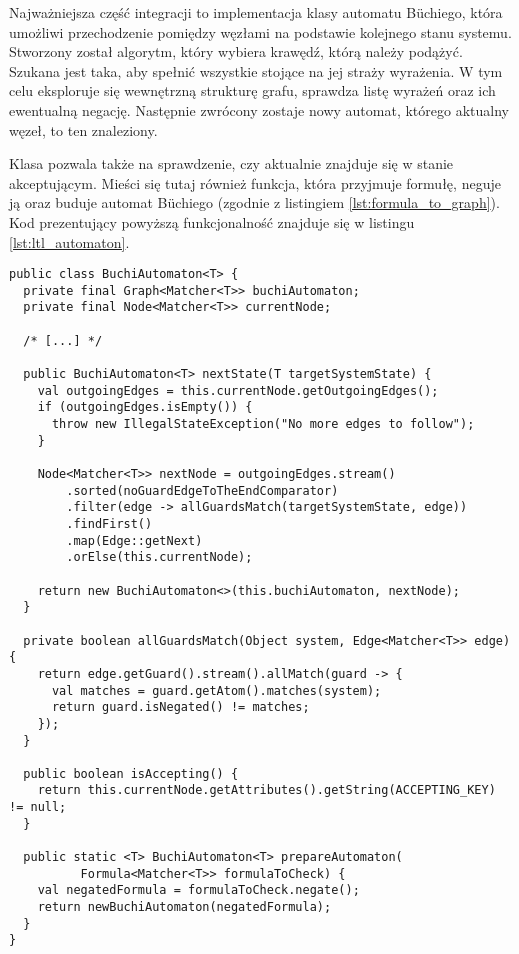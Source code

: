 Najważniejsza część integracji to implementacja klasy automatu Büchiego, która umożliwi przechodzenie pomiędzy węzłami na podstawie kolejnego stanu systemu.
Stworzony został algorytm, który wybiera krawędź, którą należy podążyć.
Szukana jest taka, aby spełnić wszystkie stojące na jej straży wyrażenia.
W tym celu eksploruje się wewnętrzną strukturę grafu, sprawdza listę wyrażeń oraz ich ewentualną negację.
Następnie zwrócony zostaje nowy automat, którego aktualny węzeł, to ten znaleziony.

Klasa pozwala także na sprawdzenie, czy aktualnie znajduje się w stanie akceptującym.
Mieści się tutaj również funkcja, która przyjmuje formułę, neguje ją oraz buduje automat Büchiego (zgodnie z listingiem \ref{lst:formula_to_graph}).
Kod prezentujący powyższą funkcjonalność znajduje się w listingu \ref{lst:ltl_automaton}.

\begin{minipage}{\linewidth}
\begin{lstlisting}[caption={Implementacja automatu Büchiego.},captionpos=b,label={lst:ltl_automaton}]
public class BuchiAutomaton<T> {
  private final Graph<Matcher<T>> buchiAutomaton;
  private final Node<Matcher<T>> currentNode;

  /* [...] */

  public BuchiAutomaton<T> nextState(T targetSystemState) {
    val outgoingEdges = this.currentNode.getOutgoingEdges();
    if (outgoingEdges.isEmpty()) {
      throw new IllegalStateException("No more edges to follow");
    }

    Node<Matcher<T>> nextNode = outgoingEdges.stream()
        .sorted(noGuardEdgeToTheEndComparator)
        .filter(edge -> allGuardsMatch(targetSystemState, edge))
        .findFirst()
        .map(Edge::getNext)
        .orElse(this.currentNode);

    return new BuchiAutomaton<>(this.buchiAutomaton, nextNode);
  }

  private boolean allGuardsMatch(Object system, Edge<Matcher<T>> edge) {
    return edge.getGuard().stream().allMatch(guard -> {
      val matches = guard.getAtom().matches(system);
      return guard.isNegated() != matches;
    });
  }

  public boolean isAccepting() {
    return this.currentNode.getAttributes().getString(ACCEPTING_KEY) != null;
  }

  public static <T> BuchiAutomaton<T> prepareAutomaton(
          Formula<Matcher<T>> formulaToCheck) {
    val negatedFormula = formulaToCheck.negate();
    return newBuchiAutomaton(negatedFormula);
  }
}

\end{lstlisting}
\end{minipage}

